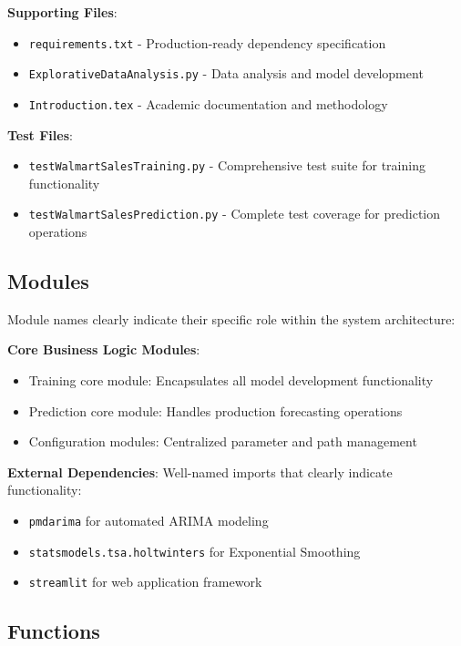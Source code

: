 \textbf{Supporting Files}:
\begin{itemize}
	\item \texttt{requirements.txt} - Production-ready dependency specification
	\item \texttt{ExplorativeDataAnalysis.py} - Data analysis and model development
	\item \texttt{Introduction.tex} - Academic documentation and methodology
\end{itemize}

\textbf{Test Files}:
\begin{itemize}
	\item \texttt{testWalmartSalesTraining.py} - Comprehensive test suite for training functionality
	\item \texttt{testWalmartSalesPrediction.py} - Complete test coverage for prediction operations
\end{itemize}

\subsection{Modules}

Module names clearly indicate their specific role within the system architecture:

\textbf{Core Business Logic Modules}:
\begin{itemize}
	\item Training core module: Encapsulates all model development functionality
	\item Prediction core module: Handles production forecasting operations
	\item Configuration modules: Centralized parameter and path management
\end{itemize}

\textbf{External Dependencies}: Well-named imports that clearly indicate functionality:
\begin{itemize}
	\item \texttt{pmdarima} for automated ARIMA modeling
	\item \texttt{statsmodels.tsa.holtwinters} for Exponential Smoothing
	\item \texttt{streamlit} for web application framework
\end{itemize}

\subsection{Functions}

